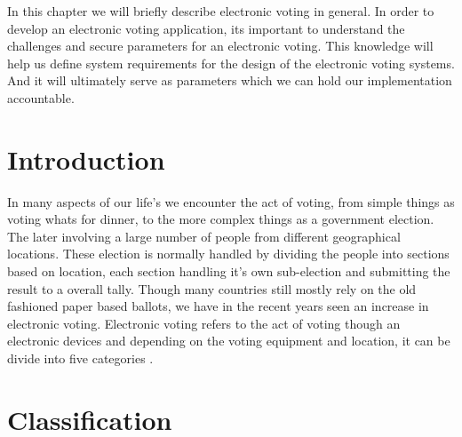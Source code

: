 In this chapter we will briefly describe electronic voting in general. In order to develop an electronic voting application, its important to understand the challenges and secure parameters for an electronic voting. This knowledge will help us define system requirements for the design of the electronic voting systems. And it will ultimately serve as parameters which we can hold our implementation accountable. 


\section{Introduction}
In many aspects of our life's we encounter the act of voting, from simple things as voting whats for dinner, to the more complex things as a government election. The later involving a large number of people from different geographical locations. These election is normally handled by dividing the people into sections based on location, each section handling it's own sub-election and submitting the result to a overall tally. Though many countries still mostly rely on the old fashioned paper based ballots, we have in the recent years seen an increase in electronic voting. Electronic voting refers to the act of voting though an electronic devices and depending on the voting equipment and location, it can be divide into five categories \cite{Cet09}. 

\section{Classification}


